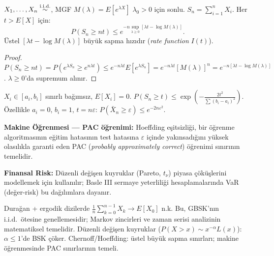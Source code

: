 \begin{teorem}\label{thm:chernoff}
$X_1,\ldots,X_n\overset{\text{i.i.d.}}{\sim}$, MGF $M(\lambda)=E[e^{\lambda X}]$ $\lambda_0>0$ için sonlu. $S_n=\sum_{i=1}^n X_i$. Her $t>E[X]$ için:
\[
  P(S_n\geq nt) \leq e^{-n\sup_{\lambda\geq0}[\lambda t - \log M(\lambda)]}.
\]
Üstel $[\lambda t - \log M(\lambda)]$ büyük sapma hızıdır (\emph{rate function} $I(t)$).
\end{teorem}

\begin{proof}
$P(S_n\geq nt)=P(e^{\lambda S_n}\geq e^{n\lambda t})\leq e^{-n\lambda t}E[e^{\lambda S_n}]=e^{-n\lambda t}[M(\lambda)]^n=e^{-n[\lambda t-\log M(\lambda)]}$.
$\lambda\geq0$'da supremum alınır.
\end{proof}

\begin{ornek}\label{ex:hoeffding}
$X_i\in[a_i,b_i]$ sınırlı bağımsız, $E[X_i]=0$. $P(S_n\geq t)\leq\exp\!\left(-\frac{2t^2}{\sum(b_i-a_i)^2}\right)$.
Özellikle $a_i=0$, $b_i=1$, $t=n\varepsilon$: $P(\bar X_n\geq\varepsilon)\leq e^{-2n\varepsilon^2}$.
\end{ornek}

\begin{disiplinlerarasibaglan}
\textbf{Makine Öğrenmesi --- PAC öğrenimi:} Hoeffding eşitsizliği, bir öğrenme algoritmasının eğitim hatasının test hatasına $\varepsilon$ içinde yakınsadığını yüksek olasılıkla garanti eden PAC (\emph{probably approximately correct}) öğrenimi sınırının temelidir.

\textbf{Finansal Risk:} Düzenli değişen kuyruklar (Pareto, $t_\nu$) piyasa çöküşlerini modellemek için kullanılır; Basle III sermaye yeterliliği hesaplamalarında VaR (değer-risk) bu dağılımlara dayanır.
\end{disiplinlerarasibaglan}

\begin{mikroozet}
Durağan + ergodik dizilerde $\frac{1}{n}\sum_{k=0}^{n-1}X_k \to E[X_0]$ n.k.
Bu, GBSK'nın i.i.d.\ ötesine genellemesidir; Markov zincirleri ve zaman serisi
analizinin matematiksel temelidir.
Düzenli değişen kuyruklar ($P(X>x)\sim x^{-\alpha}L(x)$): $\alpha\leq1$'de BSK çöker.
Chernoff/Hoeffding: üstel büyük sapma sınırları; makine öğrenmesinde PAC sınırlarının temeli.
\end{mikroozet}


